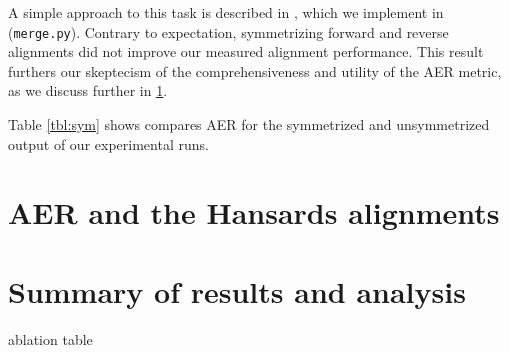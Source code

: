 \documentclass{article}
\begin{document}
\begin{figure}
\begin{center}
\end{center}
\label{fig:etof}
\end{figure}

A simple approach to this task is described in \cite{koehn}, which we implement in ({\tt merge.py}). Contrary to expectation, symmetrizing forward and reverse alignments did not improve our measured alignment performance. This result furthers our skeptecism of the comprehensiveness and utility of the AER metric, as we discuss further in \ref{aer}.

Table \ref{tbl:sym} shows compares AER for the symmetrized and unsymmetrized output of our experimental runs.

\section{AER and the Hansards alignments}
\label{aer}

\section{Summary of results and analysis}

ablation table
\end{document}
